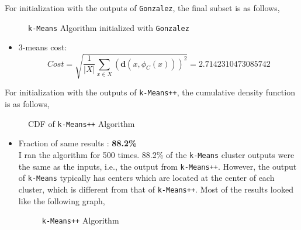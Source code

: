 \documentclass[11pt]{article}
\begin{document}
For initialization with the outputs of \texttt{Gonzalez}, the final subset is as follows,
\begin{figure}[H]
\caption{\texttt{k-Means} Algorithm initialized with \texttt{Gonzalez}}
\label{fig:name}
\end{figure}
\begin{itemize}
\item 3-means cost:
$$Cost=\sqrt{\frac{1}{|X|}\sum_{x\in X}(\mathbf{d}(x, \phi_C(x)))^2}=2.7142310473085742$$
\end{itemize}

For initialization with the outputs of \texttt{k-Means++}, the cumulative density function is as follows,
\begin{figure}[H]
\caption{CDF of \texttt{k-Means++} Algorithm}
\label{fig:name}
\end{figure}

\begin{itemize}
\item Fraction of same results : \textbf{88.2\%}\\
I ran the algorithm for 500 times. 88.2\% of the \texttt{k-Means} cluster outputs were the same as the inputs, i.e., the output from \texttt{k-Means++}. However, the output of \texttt{k-Means} typically has centers which are located at the center of each cluster, which is different from that of \texttt{k-Means++}. Most of the results looked like the following graph,
\begin{figure}[H]
\caption{\texttt{k-Means++} Algorithm}
\label{fig:name}
\end{figure}
\end{itemize}
\end{document}
